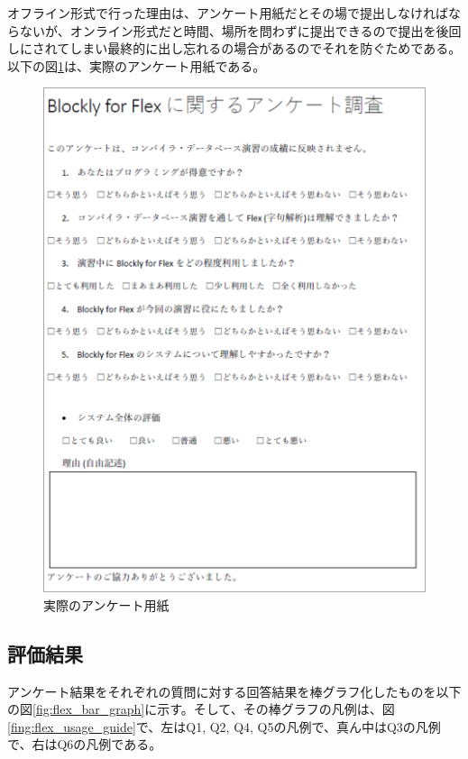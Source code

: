 \documentclass{risepaper}
\begin{document}
オフライン形式で行った理由は、アンケート用紙だとその場で提出しなければならないが、オンライン形式だと時間、場所を問わずに提出できるので提出を後回しにされてしまい最終的に出し忘れるの場合があるのでそれを防ぐためである。以下の図\ref{fig:questionnaire}は、実際のアンケート用紙である。

\begin{figure}[h]
\begin{center}
\includegraphics[scale=1.0]{img/questionnaire.PNG}
\caption{実際のアンケート用紙}%
\label{fig:questionnaire}
\end{center}%
\end{figure}%


   		\subsection{評価結果}

アンケート結果をそれぞれの質問に対する回答結果を棒グラフ化したものを以下の図\ref{fig:flex_bar_graph}に示す。そして、その棒グラフの凡例は、図\ref{fing:flex_usage_guide}で、左はQ1, Q2, Q4, Q5の凡例で、真ん中はQ3の凡例で、右はQ6の凡例である。
\end{document}
